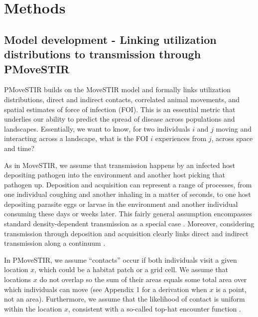 \documentclass[letterpaper]{article}
\begin{document}
\section*{Methods}

\subsection*{Model development - Linking utilization distributions to transmission through PMoveSTIR}

PMoveSTIR builds on the MoveSTIR model \citep{Wilber2022} and formally links utilization distributions, direct and indirect contacts, correlated animal movements, and spatial estimates of force of infection (FOI). This is an essential metric that underlies our ability to predict the spread of disease across populations and landscapes. Essentially, we want to know, for two individuals $i$ and $j$ moving and interacting across a landscape, what is the FOI $i$ experiences from $j$, across space and time?  

As in MoveSTIR, we assume that transmission happens by an infected host depositing pathogen into the environment and another host picking that pathogen up. 
Deposition and acquisition can represent a range of processes, from one individual coughing and another inhaling in a matter of seconds, to one host depositing parasite eggs or larvae in the environment and another individual consuming these days or weeks later. 
This fairly general assumption encompasses standard density-dependent transmission as a special case \citep{Cortez2021}. 
Moreover, considering transmission through deposition and acquisition clearly links direct and indirect transmission along a continuum \citep{Wilber2022}.

In PMoveSTIR, we assume ``contacts'' occur if both individuals visit a given location $x$, which could be a habitat patch or a grid cell. 
We assume that locations $x$ do not overlap so the sum of their areas equals some total area over which individuals can move (see Appendix 1 for a derivation when $x$ is a point, not an area). 
Furthermore, we assume that the likelihood of contact is uniform within the location $x$, consistent with a so-called top-hat encounter function \citep{Gurarie2013,Wilber2022}.
\end{document}
